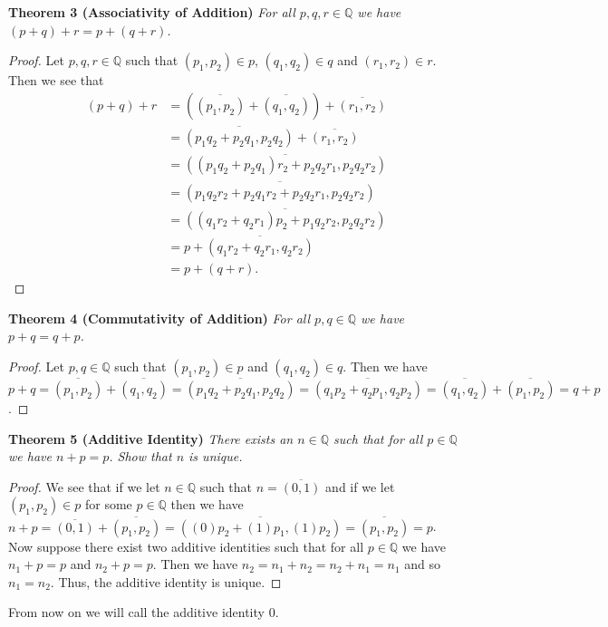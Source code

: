 \documentclass{article}
\begin{document}
\begin{flushleft}
\textbf{Theorem 3 (Associativity of Addition)}
\textsl{For all $p,q,r \in \mathbb{Q}$ we have $(p+q)+r = p+(q+r)$.}
\begin{proof}
Let $p,q,r \in \mathbb{Q}$ such that $(p_1,p_2) \in p$, $(q_1,q_2) \in q$ and $(r_1,r_2) \in r$. Then we see that
\begin{align*}
(p+q)+r&=\left(\overline{(p_1,p_2)}+\overline{(q_1,q_2)}\right)+\overline{(r_1,r_2)} \\
		&=\overline{(p_1q_2+p_2q_1,p_2q_2)}+\overline{(r_1,r_2)} \\
		&=\overline{((p_1q_2+p_2q_1)r_2+p_2q_2r_1,p_2q_2r_2)} \\
		&=\overline{(p_1q_2r_2+p_2q_1r_2+p_2q_2r_1,p_2q_2r_2)} \\
		&=\overline{((q_1r_2+q_2r_1)p_2+p_1q_2r_2,p_2q_2r_2)} \\
		&=p+\overline{(q_1r_2+q_2r_1,q_2r_2)} \\
		&=p+(q+r).
\end{align*}
\end{proof}

\textbf{Theorem 4 (Commutativity of Addition)}
\textsl{For all $p,q \in \mathbb{Q}$ we have $p+q=q+p$.}
\begin{proof}
Let $p,q \in \mathbb{Q}$ such that $(p_1,p_2) \in p$ and $(q_1,q_2) \in q$. Then we have $p+q=\overline{(p_1,p_2)}+\overline{(q_1,q_2)}=\overline{(p_1q_2+p_2q_1,p_2q_2)}=\overline{(q_1p_2+q_2p_1,q_2p_2)}=\overline{(q_1,q_2)}+\overline{(p_1,p_2)}=q+p$.
\end{proof}

\textbf{Theorem 5 (Additive Identity)}
\textsl{There exists an $n \in \mathbb{Q}$ such that for all $p \in \mathbb{Q}$ we have $n+p=p$. Show that $n$ is unique.}
\begin{proof}
We see that if we let $n \in \mathbb{Q}$ such that $n = \overline{(0,1)}$ and if we let $(p_1,p_2) \in p$ for some $p \in \mathbb{Q}$ then we have $n+p=\overline{(0,1)}+\overline{(p_1,p_2)}=\overline{((0)p_2+(1)p_1,(1)p_2)}=\overline{(p_1,p_2)}=p$. Now suppose there exist two additive identities such that for all $p \in \mathbb{Q}$ we have $n_1+p=p$ and $n_2+p=p$. Then we have $n_2=n_1+n_2 = n_2+n_1=n_1$ and so $n_1=n_2$. Thus, the additive identity is unique.
\end{proof}

From now on we will call the additive identity $0$.\newline


\end{flushleft}
\end{document}
